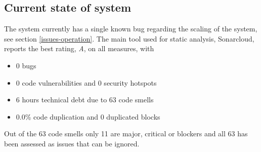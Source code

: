 \subsection{Current state of system}
The system currently has a single known bug regarding the scaling of the system, see section \ref{issues-operation}. The main tool used for static analysis, Sonarcloud, reports the best rating, \textit{A}, on all measures, with 

\begin{itemize}
    \item 0 bugs
    \item 0 code vulnerabilities and 0 security hotspots
    \item 6 hours technical debt due to 63 code smells
    \item 0.0\% code duplication and 0 duplicated blocks
\end{itemize}

Out of the 63 code smells only 11 are major, critical or blockers and all 63 has been assessed as issues that can be ignored.